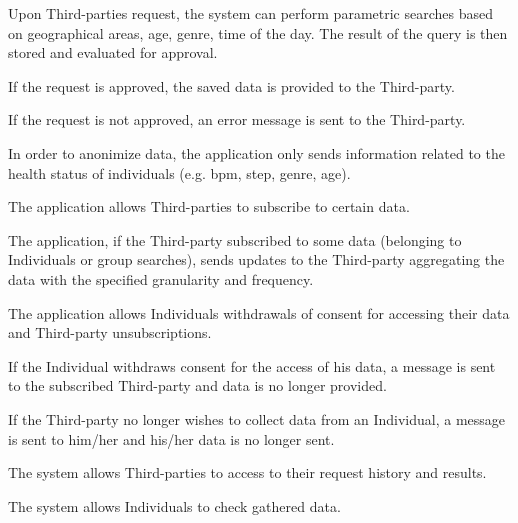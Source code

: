 \begin{enumerate}[label={[}R1.\arabic*{]}, leftmargin=*]
    \item \label{R1-group-requests} Upon Third-parties request, the system can perform parametric searches based on geographical areas, age, genre, time of the day. The result of the query is then stored and evaluated for approval.
    \begin{enumerate}[label={[}R1.\arabic{enumi}.\arabic*{]}, leftmargin=*]
        \item \label{R1-group-req-approuved} If the request is approved, the saved data is provided to the Third-party.
        \item \label{R1-group-request-refused} If the request is not approved, an error message is sent to the Third-party.
        \item \label{R1-group-data-anonymized} In order to anonimize data, the application only sends information related to the health status of individuals (e.g. bpm, step, genre, age).
    \end{enumerate}
        
    \item \label{R1-third-party-subscription} The application allows Third-parties to subscribe to certain data.
    \begin{enumerate}[label={[}R1.\arabic{enumi}.\arabic*{]}, leftmargin=*]
        \item \label{R1-subscription-updates} The application, if the Third-party subscribed to some data (belonging to Individuals or group searches), sends updates to the Third-party aggregating the data with the specified granularity and frequency.
    \end{enumerate}
        
    \item \label{R1-unsubscription} The application allows Individuals withdrawals of consent for accessing their data and Third-party unsubscriptions.
    \begin{enumerate}[label={[}R1.\arabic{enumi}.\arabic*{]}, leftmargin=*]
        \item \label{R1-Individual-unsubscription} If the Individual withdraws consent for the access of his data, a message is sent to the subscribed Third-party and data is no longer provided.
        \item \label{R1-third-party-unsubscription} If the Third-party no longer wishes to collect data from an Individual, a message is sent to him/her and his/her data is no longer sent.
    \end{enumerate}
        
        
    \item \label{R1-history-request} The system allows Third-parties to access to their request history and results.
    
    \item \label{R1-individual-personal-data} The system allows Individuals to check gathered data.

\end{enumerate}


